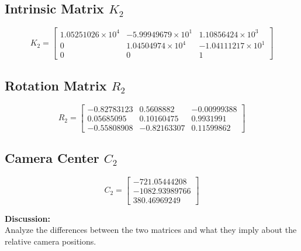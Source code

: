 \documentclass{article}
\begin{document}
\subsection*{Intrinsic Matrix \( K_2 \)}
\[
K_2 =
\begin{bmatrix}
1.05251026 \times 10^4 & -5.99949679 \times 10^1 & 1.10856424 \times 10^3 \\
0 & 1.04504974 \times 10^4 & -1.04111217 \times 10^1 \\
0 & 0 & 1
\end{bmatrix}
\]

\subsection*{Rotation Matrix \( R_2 \)}
\[
R_2 =
\begin{bmatrix}
-0.82783123 & 0.5608882 & -0.00999388 \\
0.05685095 & 0.10160475 & 0.9931991 \\
-0.55808908 & -0.82163307 & 0.11599862
\end{bmatrix}
\]

\subsection*{Camera Center \( C_2 \)}
\[
C_2 =
\begin{bmatrix}
-721.05444208 \\
-1082.93989766 \\
380.46969249
\end{bmatrix}
\]

\textbf{Discussion:} \\
Analyze the differences between the two matrices and what they imply about the relative camera positions.
\end{document}
